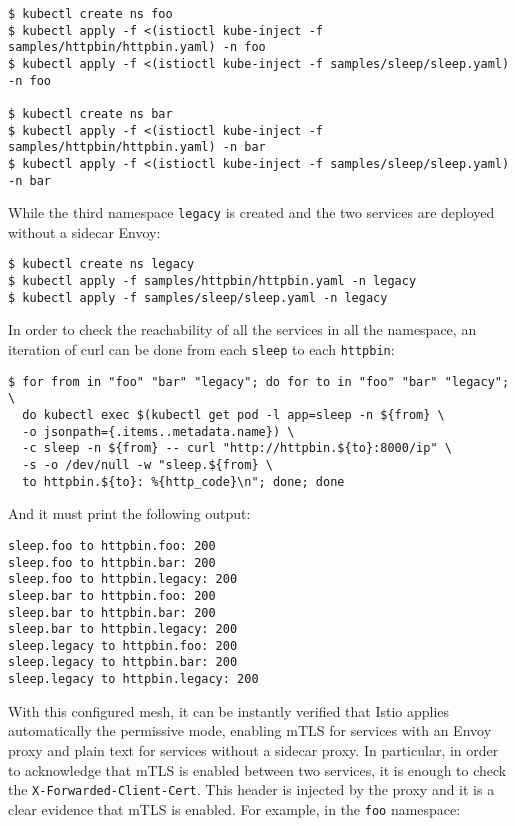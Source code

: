 \begin{lstlisting}[basicstyle = \scriptsize]
$ kubectl create ns foo
$ kubectl apply -f <(istioctl kube-inject -f samples/httpbin/httpbin.yaml) -n foo
$ kubectl apply -f <(istioctl kube-inject -f samples/sleep/sleep.yaml) -n foo

$ kubectl create ns bar
$ kubectl apply -f <(istioctl kube-inject -f samples/httpbin/httpbin.yaml) -n bar
$ kubectl apply -f <(istioctl kube-inject -f samples/sleep/sleep.yaml) -n bar
\end{lstlisting}

\noindent While the third namespace \texttt{legacy} is created and the two services are deployed without a sidecar Envoy:

\begin{lstlisting}
$ kubectl create ns legacy
$ kubectl apply -f samples/httpbin/httpbin.yaml -n legacy
$ kubectl apply -f samples/sleep/sleep.yaml -n legacy
\end{lstlisting}

\noindent In order to check the reachability of all the services in all the namespace, an iteration of curl can be done from each \texttt{sleep} to each \texttt{httpbin}:

\begin{lstlisting}
$ for from in "foo" "bar" "legacy"; do for to in "foo" "bar" "legacy";  \
  do kubectl exec $(kubectl get pod -l app=sleep -n ${from} \
  -o jsonpath={.items..metadata.name}) \
  -c sleep -n ${from} -- curl "http://httpbin.${to}:8000/ip" \ 
  -s -o /dev/null -w "sleep.${from} \
  to httpbin.${to}: %{http_code}\n"; done; done
\end{lstlisting}

\noindent And it must print the following output:

\begin{lstlisting}
sleep.foo to httpbin.foo: 200
sleep.foo to httpbin.bar: 200
sleep.foo to httpbin.legacy: 200
sleep.bar to httpbin.foo: 200
sleep.bar to httpbin.bar: 200
sleep.bar to httpbin.legacy: 200
sleep.legacy to httpbin.foo: 200
sleep.legacy to httpbin.bar: 200
sleep.legacy to httpbin.legacy: 200
\end{lstlisting}

With this configured mesh, it can be instantly verified that Istio applies automatically the permissive mode, enabling mTLS for services with an Envoy proxy and plain text for services without a sidecar proxy. In particular, in order to acknowledge that mTLS is enabled between two services, it is enough to check the \texttt{X-Forwarded-Client-Cert}. This header is injected by the proxy and it is a clear evidence that mTLS is enabled. For example, in the \texttt{foo} namespace:

